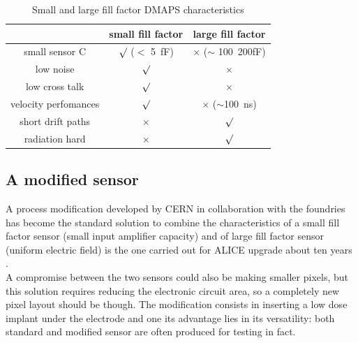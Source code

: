       \begin{table}
         \begin{center}
         \begin{tabular}{|c | c |c |}
         \hline
         & small fill factor & large fill factor\\
         \hline
         \hline
         small sensor C & $\surd$ ($<$ \SI{5}{fF}) & $\times$ ($\sim$ \SI{100}{200}{fF})\\
         low noise & $\surd$ & $\times$\\
         low cross talk & $\surd$ & $\times$ \\
         velocity perfomances & $\surd$ & $\times$ ($\sim$\SI{100}{ns})\\
         short drift paths & $\times$ & $\surd$ \\
         radiation hard & $\times$ & $\surd$ \\
         \hline
         \end{tabular}
         \caption{Small and large fill factor DMAPS characteristics}
         \label{tab:DMAPS_large_small_fillfactor}
         \end{center}
      \end{table}

   \subsection{A modified sensor}\label{chap:a_modified_sensor}
      A process modification developed by CERN in collaboration with the foundries has become the standard solution to combine the characteristics of a small fill factor sensor (small input amplifier capacity) and of large fill factor sensor (uniform electric field) is the one carried out for ALICE upgrade about ten years \cite{AProcessModification}.\\
      A compromise between the two sensors could also be making smaller pixels, but this solution requires reducing the electronic circuit area, so a completely new pixel layout should be though. The modification consists in inserting a low dose implant under the electrode and one its advantage lies in its versatility: both standard and modified sensor are often produced for testing in fact.

